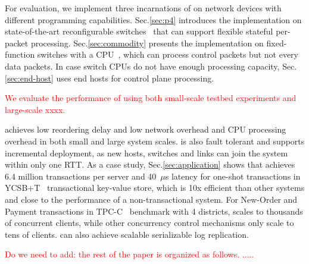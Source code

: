 For evaluation, we implement three incarnations of \sys on network devices with different programming capabilities.
Sec.\ref{sec:p4} introduces the implementation on state-of-the-art reconfigurable switches~\cite{tofino,cavium} that can support flexible stateful per-packet processing.
Sec.\ref{sec:commodity} presents the implementation on fixed-function switches with a CPU~\cite{arista}, which can process control packets but not every data packets.
In case switch CPUs do not have enough processing capacity, Sec.\ref{sec:end-host} uses end hosts for control plane processing.



\textcolor{red}{We evaluate the performance of \sys using both small-scale testbed experiments and large-scale xxxx.}

\sys achieves low reordering delay and low network overhead and CPU processing overhead in both small and large system scales.
\sys is also fault tolerant and supports incremental deployment, as new hosts, switches and links can join the system within only one RTT.
As a case study, Sec.\ref{sec:application} shows that \sys achieves 6.4 million transactions per server and 40~$\mu$s latency for one-shot transactions in YCSB+T~\cite{dey2014ycsbt} transactional key-value store, which is 10x efficient than other systems and close to the performance of a non-transactional system.
For New-Order and Payment transactions in TPC-C~\cite{tpcc} benchmark with 4 districts, \sys scales to thousands of concurrent clients, while other concurrency control mechanisms only scale to tens of clients.
\sys can also achieve scalable serializable log replication.

\textcolor{red}{Do we need to add: the rest of the paper is organized as follows. .....}
